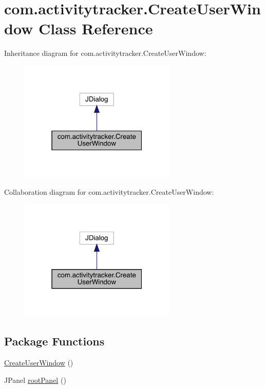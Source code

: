 \hypertarget{classcom_1_1activitytracker_1_1_create_user_window}{}\section{com.\+activitytracker.\+Create\+User\+Window Class Reference}
\label{classcom_1_1activitytracker_1_1_create_user_window}


Inheritance diagram for com.\+activitytracker.\+Create\+User\+Window\+:\nopagebreak
\begin{figure}[H]
\begin{center}
\leavevmode
\includegraphics[width=211pt]{classcom_1_1activitytracker_1_1_create_user_window__inherit__graph}
\end{center}
\end{figure}


Collaboration diagram for com.\+activitytracker.\+Create\+User\+Window\+:\nopagebreak
\begin{figure}[H]
\begin{center}
\leavevmode
\includegraphics[width=211pt]{classcom_1_1activitytracker_1_1_create_user_window__coll__graph}
\end{center}
\end{figure}
\subsection*{Package Functions}
\begin{DoxyCompactItemize}
\item 
\mbox{\hyperlink{classcom_1_1activitytracker_1_1_create_user_window_a46b8b719c490fe8f658fa7a1f27d0be7}{Create\+User\+Window}} ()
\item 
J\+Panel \mbox{\hyperlink{classcom_1_1activitytracker_1_1_create_user_window_a862f018ae96eb5df7529ff1beb312ff1}{root\+Panel}} ()
\end{DoxyCompactItemize}
